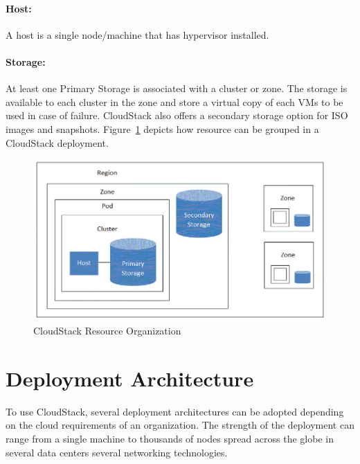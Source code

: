 \paragraph{Host:}	A host is a single node/machine that has hypervisor installed.
\paragraph{Storage:}	At least one Primary Storage is associated with a cluster or zone. The 
storage is available to each cluster in the zone and store a virtual copy of 
each VMs to be used in case of failure. CloudStack also offers a secondary storage
option for ISO images and snapshots.
Figure~\ref{F:cloudstack-resource-group} depicts how resource can 
be grouped in a CloudStack
deployment.
\begin{figure}[htb]
\includegraphics[width=\textwidth]{images/hid-sp18-417-cloudstack.png}
\caption{CloudStack Resource Organization~\cite{hid-sp18-417-cloudstack-resource-grouping}}
\label{F:cloudstack-resource-group}
\end{figure}

\section{Deployment Architecture}

To use CloudStack, several deployment architectures can be adopted
depending on the cloud requirements of an organization. The strength
of the deployment can range from a single machine to thousands of
nodes spread across the globe in several data centers several
networking technologies.

